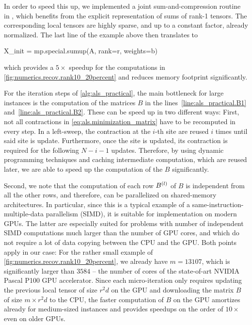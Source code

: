 In order to speed this up, we implemented a joint sum-and-compression routine in \mpnum, which benefits from the explicit representation of sums of rank-1 tensors.
The corresponding local tensors are highly sparse, and up to a constant factor, already normalized.
The last line of the example above then translates to
\begin{pythoncode}
  X_init = mp.special.sumup(A, rank=r, weights=b)
\end{pythoncode}
which provides a $5\times$ speedup for the computations in \cref{fig:numerics.recov.rank10_20percent} and reduces memory footprint significantly.

For the iteration steps of \cref{alg:als_practical}, the main bottleneck for large instances is the computation of the matrices $B$ in the lines~\ref{line:als_practical.B1} and~\ref{line:als_practical.B2}.
These can be speed up in two different ways:
First, not all contractions in \cref{eq:als.minimization_matrix} have to be recomputed in every step.
In a left-sweep, the contraction at the $i$-th site are reused $i$ times until said site is update.
Furthermore, once the site is updated, its contraction is required for the following $N - i - 1$ updates.
Therefore, by using dynamic programming techniques and caching intermediate computation, which are reused later, we are able to speed up the computation of the $B$ significantly.

Second, we note that the computation of each row $B^{(l)}$ of $B$ is independent from all the other rows, and therefore, can be parallelized on shared-memory architectures.
In particular, since this is a typical example of a same-instruction-multiple-data parallelism (SIMD), it is suitable for implementation on modern GPUs.
The latter are especially suited for problems with number of independent SIMD computations much larger than the number of GPU cores, and which do not require a lot of data copying between the CPU and the GPU.
Both points apply in our case:
For the rather small example of \cref{fig:numerics.recov.rank10_20percent}, we already have $m = 13107$, which is significantly larger than $3584$ -- the number of cores of the state-of-art NVIDIA Pascal P100 GPU accelerator.
Since each micro-iteration only requires updating the previous local tensor of size $r^2 d$ on the GPU and downloading the matrix $B$ of size $m \times r^2d$ to the CPU, the faster computation of $B$ on the GPU amortizes already for medium-sized instances and provides speedups on the order of $10\times$ even on older GPUs.

